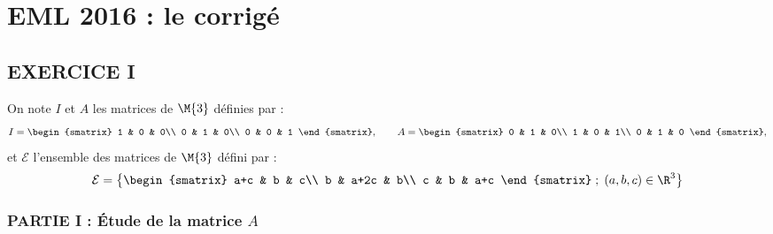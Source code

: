 \chapter*{EML 2016 : le corrigé}
  
%

\section*{EXERCICE I}

\noindent
On note $I$ et $A$ les matrices de $\M{3}$ définies 
par :
\[
I=
\begin{smatrix}
 1 & 0 & 0\\
 0 & 1 & 0\\
 0 & 0 & 1
\end{smatrix}
, \qquad 
A=
\begin{smatrix}
 0 & 1 & 0\\
 1 & 0 & 1\\
 0 & 1 & 0
\end{smatrix},
\]
et $\mathcal{E}$ l'ensemble des matrices de $\M{3}$ 
défini par :
\[
\mathcal{E}=\left\{
\begin{smatrix}
 a+c & b & c\\
 b & a+2c & b\\
 c & b & a+c
\end{smatrix} \; ; \; (a,b,c) \in \R^3 \right\}
\]

\subsection*{PARTIE I : Étude de la matrice $A$}

